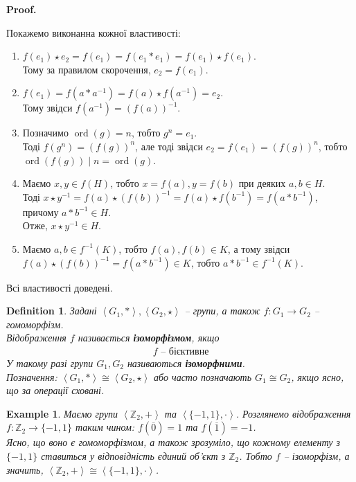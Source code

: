 \documentclass[a4paper, 10pt]{article}
\makeatletter
\theoremstyle{theoremdd}
\theoremstyle{theoremdd}
\newtheorem{definition}[theorem]{Definition}
\theoremstyle{theoremdd}
\theoremstyle{theoremdd}
\theoremstyle{theoremdd}
\newtheorem{example}[theorem]{Example}
\theoremstyle{theoremdd}
\theoremstyle{theoremdd}
\theoremstyle{theoremdd}
\theoremstyle{theoremdd}
\theoremstyle{theoremdd}
\theoremstyle{theoremdd}
\theoremstyle{theoremdd}
\theoremstyle{theoremdd}
\theoremstyle{theoremdd}
\theoremstyle{theoremdd}
\renewenvironment{proof}[1][Proof.\\]{\par
\pushQED{\hfill \qed}%
\normalfont \topsep6\p@\@plus6\p@\relax
\trivlist
\item\relax
{\bfseries
#1\@addpunct{.}}\hspace\labelsep\ignorespaces
}{%
\popQED\endtrivlist\@endpefalse
}
\DeclareMathOperator{\ord}{ord}
\makeatother
\begin{document}
\begin{proof}
Покажемо виконанна кожної властивості:
\begin{enumerate}[wide=0pt, label={\arabic*)}]
\item $f(e_1) \star e_2 = f(e_1) = f(e_1*e_1) = f(e_1) \star f(e_1)$. \\
Тому за правилом скорочення, $e_2 = f(e_1)$.

\item $f(e_1) = f(a*a^{-1}) = f(a) \star f(a^{-1}) = e_2$.\\
Тому звідси $f(a^{-1}) = (f(a))^{-1}$.

\item Позначимо $\ord(g) = n$, тобто $g^n = e_1$.\\
Тоді $f(g^n) = (f(g))^n$, але тоді звідси $e_2 = f(e_1) = (f(g))^n$, тобто $\ord (f(g)) \mid n = \ord (g)$.

\item Маємо $x,y \in f(H)$, тобто $x = f(a), y = f(b)$ при деяких $a,b \in H$.\\
Тоді $x \star y^{-1} = f(a) \star (f(b))^{-1} = f(a) \star f(b^{-1}) = f(a*b^{-1})$, причому $a*b^{-1} \in H$.\\
Отже, $x \star y^{-1} \in H$.

\item Маємо $a,b \in f^{-1}(K)$, тобто $f(a),f(b) \in K$, а тому звідси \\
$f(a) \star (f(b))^{-1} = f(a * b^{-1}) \in K$, тобто $a*b^{-1} \in f^{-1}(K)$.
\end{enumerate}
Всі властивості доведені.
\end{proof}

\begin{definition}
Задані $\left<G_1, * \right>, \left<G_2, \star \right>$ -- групи, а також $f \colon G_1 \to G_2$ -- гомоморфізм.\\
Відображення $f$ називається \textbf{ізоморфізмом}, якщо
\begin{align*}
f \text{ -- бієктивне}
\end{align*}
У такому разі групи $G_1,G_2$ називаються \textbf{ізоморфними}.\\
Позначення: $\left<G_1, * \right> \cong \left<G_2, \star \right>$ або часто позначають $G_1 \cong G_2$, якщо ясно, що за операції сховані.
\end{definition}

\begin{example}
Маємо групи $\left<\mathbb{Z}_2,+ \right>$ та $\left< \{-1,1\},\cdot \right>$. Розглянемо відображення $f \colon \mathbb{Z}_2 \to \{-1,1\}$ таким чином: $f(\overline{0}) = 1$ та $f(\overline{1}) = -1$.\\
Ясно, що воно є гомоморфізмом, а також зрозуміло, що кожному елементу з $\{-1,1\}$ ставиться у відповідність єдиний об'єкт з $\mathbb{Z}_2$.  Тобто $f$ -- ізоморфізм, а значить, $\left<\mathbb{Z}_2,+ \right> \cong \left<\{-1,1\},\cdot \right>$.
\end{example}
\end{document}
